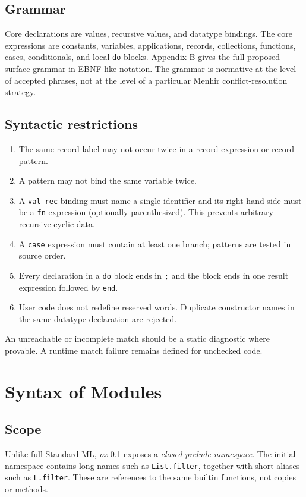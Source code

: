 \documentclass[11pt,oneside,openany]{book}
\newcommand{\ox}{\textit{ox}}
\newcommand{\kw}[1]{\texttt{#1}}
\begin{document}
\section{Grammar}
Core declarations are values, recursive values, and datatype bindings. The core expressions are constants, variables, applications, records, collections, functions, cases, conditionals, and local \kw{do} blocks. Appendix B gives the full proposed surface grammar in EBNF-like notation. The grammar is normative at the level of accepted phrases, not at the level of a particular Menhir conflict-resolution strategy.

\section{Syntactic restrictions}
\begin{enumerate}
\item The same record label may not occur twice in a record expression or record pattern.
\item A pattern may not bind the same variable twice.
\item A \kw{val rec} binding must name a single identifier and its right-hand side must be a \kw{fn} expression (optionally parenthesized). This prevents arbitrary recursive cyclic data.
\item A \kw{case} expression must contain at least one branch; patterns are tested in source order.
\item Every declaration in a \kw{do} block ends in \kw{;} and the block ends in one result expression followed by \kw{end}.
\item User code does not redefine reserved words. Duplicate constructor names in the same datatype declaration are rejected.
\end{enumerate}
An unreachable or incomplete match should be a static diagnostic where provable. A runtime match failure remains defined for unchecked code.

\chapter{Syntax of Modules}
\section{Scope}
Unlike full Standard ML, \ox{} 0.1 exposes a \emph{closed prelude namespace}. The initial namespace contains long names such as \kw{List.filter}, together with short aliases such as \kw{L.filter}. These are references to the same builtin functions, not copies or methods.
\end{document}
